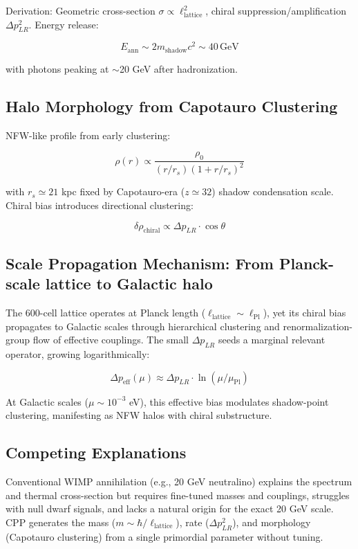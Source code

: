 \documentclass[11pt]{article}
\begin{document}
Derivation: Geometric cross-section $\sigma \propto \ell_{\text{lattice}}^2$, chiral suppression/amplification $\Delta p_{LR}^2$. Energy release:

\[
E_{\text{ann}} \sim 2 m_{\text{shadow}} c^2 \sim 40 \, \text{GeV}
\]

with photons peaking at $\sim$20 GeV after hadronization.

\subsection{Halo Morphology from Capotauro Clustering}
NFW-like profile from early clustering:

\[
\rho(r) \propto \frac{\rho_0}{(r/r_s)(1 + r/r_s)^2}
\]

with $r_s \simeq 21$ kpc fixed by Capotauro-era ($z \simeq 32$) shadow condensation scale. Chiral bias introduces directional clustering:

\[
\delta \rho_{\text{chiral}} \propto \Delta p_{LR} \cdot \cos\theta
\]

\subsection{Scale Propagation Mechanism: From Planck-scale lattice to Galactic halo}
The 600-cell lattice operates at Planck length ($\ell_{\text{lattice}} \sim \ell_{\text{Pl}}$), yet its chiral bias propagates to Galactic scales through hierarchical clustering and renormalization-group flow of effective couplings. The small $\Delta p_{LR}$ seeds a marginal relevant operator, growing logarithmically:

\[
\Delta p_{\text{eff}}(\mu) \approx \Delta p_{LR} \cdot \ln(\mu / \mu_{\text{Pl}})
\]

At Galactic scales ($\mu \sim 10^{-3}$ eV), this effective bias modulates shadow-point clustering, manifesting as NFW halos with chiral substructure.

\subsection{Competing Explanations}
Conventional WIMP annihilation (e.g., 20 GeV neutralino) explains the spectrum and thermal cross-section but requires fine-tuned masses and couplings, struggles with null dwarf signals, and lacks a natural origin for the exact 20 GeV scale. CPP generates the mass ($m \sim \hbar / \ell_{\text{lattice}}$), rate ($\Delta p_{LR}^2$), and morphology (Capotauro clustering) from a single primordial parameter without tuning.
\end{document}
